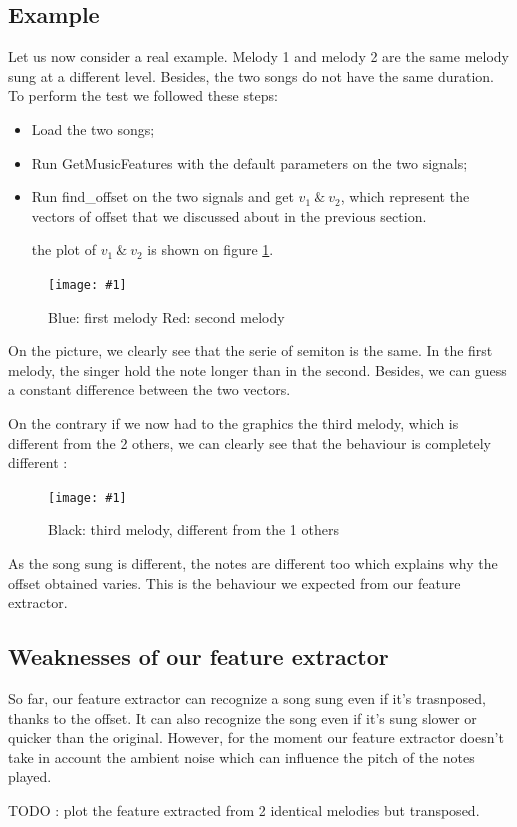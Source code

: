 \documentclass[a4paper]{report}
\newcommand{\img}[3]{\begin{figure}[!h] \centering \texttt{[image: \#1]}\captionsetup{justification=centering} \caption{#3} \label{#1} \end{figure}}
\begin{document}
\subsection{Example}
Let us now consider a real example. Melody 1 and melody 2 are the same melody sung at a different level. Besides, the two songs do not have the same duration.
To perform the test we followed these steps: \begin{itemize}
\item Load the two songs;
\item Run GetMusicFeatures with the default parameters on the two signals;
\item Run find\_offset on the two signals and get $v_{1}~\&~v_{2}$, which represent the vectors of offset that we discussed about in the previous section.

the plot of $v_{1}~\&~v_{2}$ is shown on figure \ref{test_extractor}.
\end{itemize}
\img{test_extractor}{.2}{ {\color{blue}Blue: first melody} {\color{red}Red: second melody}}
On the picture, we clearly see that the serie of semiton is the same. In the first melody, the singer hold the note longer than in the second. Besides, we can guess a constant difference between the two vectors.


On the contrary if we now had to the graphics the third melody, which is different from the 2 others, we can clearly see that the behaviour is completely different : 
\img{Comparison_3_songs}{0.5}{Black: third melody, different from the  1 others}

As the song sung is different, the notes are different too which explains why the offset obtained varies. This is the behaviour we expected from our feature extractor.


\subsection{Weaknesses of our feature extractor}

So far, our feature extractor can recognize a song sung even if it's trasnposed, thanks to the offset. It can also recognize the song even if it's sung slower or quicker than the original. However, for the moment our feature extractor doesn't take in account the ambient noise which can influence the pitch of the notes played.

TODO : plot the feature extracted from 2 identical melodies but transposed.
\end{document}
